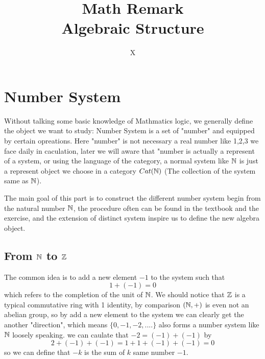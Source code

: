 \documentclass[en,geye,blue,normal,12pt]{elegantnote}
\title{Math Remark
\\ Algebraic Structure
}
\author{X}
\institute{Elegant\LaTeX{} Program}
\begin{document}
\maketitle

\newpage

\tableofcontents

\newpage

\section{Number System}
Without talking some basic knowledge of Mathmatics logic, we generally define the object we want to study: Number System is a set of "number" and equipped by certain opreations. Here "number" is not necessary a real number like 1,2,3 we face daily in caculation, later we will aware that "number is actually a represent of a system, or using the language of the category, a normal system like \(\mathbb{N}\) is just a represent object we choose in a category \(Cat(\mathbb{N})\) (The collection of the system same as \(\mathbb{N}\)).

The main goal of this part is to construct the different number system begin from the natural number \(\mathbb{N}\), the procedure often can be found in the textbook and the exercise, and the extension of distinct system inspire us to define the new algebra object.

\subsection{From \texorpdfstring{$\mathbb{N}$}{TEXT} to \texorpdfstring{$\mathbb{Z}$}{TEXT} }
The common idea is to add a new element \(-1\) to the system such that 
\[1+(-1)=0\]
which refers to the completion of the unit of \(\mathbb{N}\). We should notice that \(\mathbb{Z}\) is a typical commutative ring with 1 identity, by comparison \((\mathbb{N},+)\) is even not an abelian group, so by add a new element to the system we can clearly get the another "direction", which means \(\{0,-1,-2,....\}\) also forms a number system like \(\mathbb{N}\) loosely speaking. we can caulate that \(-2=(-1)+(-1)\) by 
\[2+(-1)+(-1)=1+1+(-1)+(-1)=0\]
so we can define that \(-k\) is the sum of \(k\) same number \(-1\). 
\end{document}
